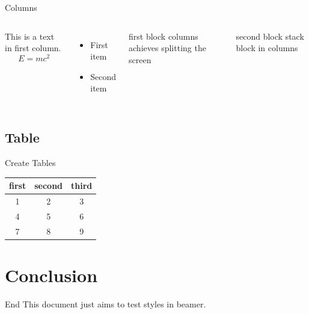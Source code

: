 \begin{frame}{Columns}
    \begin{columns}
        This is a text in first column.
        $$E=mc^2$$
        \begin{itemize}
        \item First item
        \item Second item
        \end{itemize}
        
        \begin{block}{first block}
            columns achieves splitting the screen
        \end{block}
        \begin{block}{second block}
            stack block in columns
        \end{block}
        
    \end{columns}
\end{frame}

\subsection{Table}


\begin{frame}{Create Tables}
    \begin{center}
        \begin{table}[!t]  
            \begin{tabular}{ccc}  
                \toprule   
                first&second&third\\ 
                \midrule       
                1 & 2 & 3 \\ 
                4 & 5 & 6 \\ 
                7 & 8 & 9 \\
                \bottomrule  
            \end{tabular}
        \end{table}
    \end{center}
\end{frame}



\section{Conclusion}

\begin{frame}{End}
    This document just aims to test styles in beamer.
\end{frame}